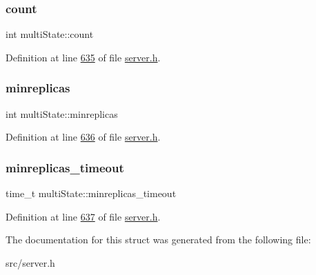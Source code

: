 \mbox{\label{structmultiState_a6e7a211ef8a0afacb59f351c00148f00}} 
\subsubsection{\texorpdfstring{count}{count}}
{\footnotesize\ttfamily int multi\+State\+::count}



Definition at line \hyperlink{server_8h_source_l00635}{635} of file \hyperlink{server_8h_source}{server.\+h}.

\mbox{\label{structmultiState_a57f8daa6e7c41c6070c218796218c9e5}} 
\subsubsection{\texorpdfstring{minreplicas}{minreplicas}}
{\footnotesize\ttfamily int multi\+State\+::minreplicas}



Definition at line \hyperlink{server_8h_source_l00636}{636} of file \hyperlink{server_8h_source}{server.\+h}.

\mbox{\label{structmultiState_a61df4a277eaa32bcf146055cd635e750}} 
\subsubsection{\texorpdfstring{minreplicas\+\_\+timeout}{minreplicas\_timeout}}
{\footnotesize\ttfamily time\+\_\+t multi\+State\+::minreplicas\+\_\+timeout}



Definition at line \hyperlink{server_8h_source_l00637}{637} of file \hyperlink{server_8h_source}{server.\+h}.



The documentation for this struct was generated from the following file\+:\begin{DoxyCompactItemize}
\item 
src/server.\+h\end{DoxyCompactItemize}
